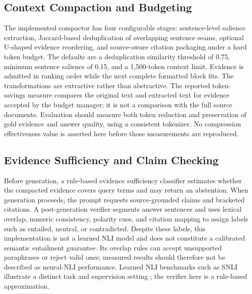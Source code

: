 \documentclass[conference]{IEEEtran}
\begin{document}
\subsection{Context Compaction and Budgeting}
The implemented compactor has four configurable stages: sentence-level
salience extraction, Jaccard-based deduplication of overlapping sentence
seams, optional U-shaped evidence reordering, and source-aware citation
packaging under a hard token budget. The defaults are a deduplication
similarity threshold of 0.75, minimum sentence salience of 0.15, and a
1,500-token context limit. Evidence is admitted in ranking order while the
next complete formatted block fits. The transformations are extractive rather
than abstractive. The reported token-savings measure compares the original
text and extracted text for evidence accepted by the budget manager; it is
not a comparison with the full source documents. Evaluation should measure
both token reduction and preservation of gold evidence and answer quality,
using a consistent tokenizer. No compression effectiveness value is asserted
here before those measurements are reproduced.

\subsection{Evidence Sufficiency and Claim Checking}
Before generation, a rule-based evidence sufficiency classifier estimates
whether the compacted evidence covers query terms and may return an
abstention. When generation proceeds, the prompt requests source-grounded
claims and bracketed citations. A post-generation verifier segments answer
sentences and uses lexical overlap, numeric consistency, polarity cues, and
citation mapping to assign labels such as entailed, neutral, or contradicted.
Despite these labels, this implementation is not a learned NLI model and does
not constitute a calibrated semantic entailment guarantee. Its overlap rules
can accept unsupported paraphrases or reject valid ones; measured results
should therefore not be described as neural-NLI performance. Learned NLI
benchmarks such as SNLI illustrate a distinct task and supervision setting
\cite{bowman2015snli}; the verifier here is a rule-based approximation.
\end{document}
